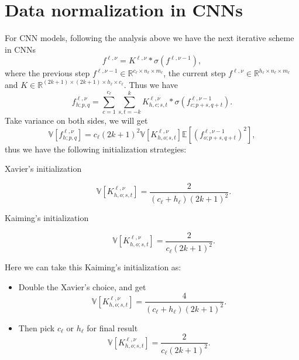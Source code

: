 \section{Data normalization in CNNs}
For CNN models, following the analysis above we have the next iterative scheme in CNNs
\begin{equation}\label{key}
f^{\ell,\nu} = K^{\ell,\nu} \ast \sigma (f^{\ell,\nu-1}),
\end{equation}
where the previous step $f^{\ell,\nu-1} \in \mathbb{R}^{c_\ell\times n_\ell \times m_\ell }$, the current step $f^{\ell,\nu} \in \mathbb{R}^{h_\ell\times n_\ell \times m_\ell}$ and $K \in \mathbb{R}^{(2k+1) \times (2k+1) \times h_\ell \times c_\ell}$.
Thus we have
\begin{equation}\label{key}
f^{\ell,\nu}_{h;p,q} = \sum_{c=1}^{c_\ell}\sum_{s,t=-k}^k K^{\ell,\nu}_{h,c;s,t} \ast \sigma (f^{\ell,\nu-1}_{c;p+s,q+t}).
\end{equation}
Take variance on both sides, we will get
\begin{equation}\label{key}
\mathbb{V} [f^{\ell,\nu}_{h;p,q}] = c_\ell (2k+1)^2 \mathbb{V}[K^{\ell,\nu}_{h,o;s,t}] \mathbb{E}[(f^{\ell,\nu-1}_{o;p+s,q+t})^2],
\end{equation}
thus we have the following initialization strategies:
\begin{description}
	\item[Xavier's initialization] 
	\begin{equation}\label{key}
	\mathbb{V}[K^{\ell,\nu}_{h,o;s,t}] = \frac{2}{ (c_\ell + h_\ell) (2k+1)^2}.
	\end{equation}
	\item[Kaiming's initialization]
	\begin{equation}\label{key}
	\mathbb{V}[K^{\ell,\nu}_{h,o;s,t}] = \frac{2}{c_\ell (2k+1)^2}.
	\end{equation}
\end{description}

Here we can take this Kaiming's initialization as:
\begin{itemize}
	\item Double the Xavier's choice, and get
	\begin{equation}\label{key}
	\mathbb{V}[K^{\ell,\nu}_{h,o;s,t}] = \frac{4}{(c_\ell + h_\ell )(2k+1)^2}.
\end{equation}
	\item Then pick $c_\ell$ or $h_\ell$ for final result  
	\begin{equation}\label{key}
	\mathbb{V}[K^{\ell,\nu}_{h,o;s,t}] = \frac{2}{c_\ell (2k+1)^2}.
	\end{equation}
\end{itemize}

